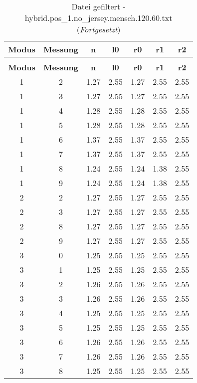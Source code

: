 \begin{longtable}{|c|c||c||c||c|c|c|}
	\caption{Datei gefiltert - hybrid.pos\_1.no\_jersey.mensch.120.60.txt} \label{tab:hybrid.pos-1.no-jersey.mensch.120.60.txt} \\ \hline
	\textbf{Modus} & \textbf{Messung} & \textbf{n} & \textbf{l0} & \textbf{r0} & \textbf{r1} & \textbf{r2}\\ \hline
	\endfirsthead
	\caption[]{Datei gefiltert - hybrid.pos\_1.no\_jersey.mensch.120.60.txt (\emph{Fortgesetzt})} \\ \hline
	\textbf{Modus} & \textbf{Messung} & \textbf{n} & \textbf{l0} & \textbf{r0} & \textbf{r1} & \textbf{r2}\\ \hline
	\endhead
	1 & 2 & 1.27 & 2.55 & 1.27 & 2.55 & 2.55 \\ \hline
	1 & 3 & 1.27 & 2.55 & 1.27 & 2.55 & 2.55 \\ \hline
	1 & 4 & 1.28 & 2.55 & 1.28 & 2.55 & 2.55 \\ \hline
	1 & 5 & 1.28 & 2.55 & 1.28 & 2.55 & 2.55 \\ \hline
	1 & 6 & 1.37 & 2.55 & 1.37 & 2.55 & 2.55 \\ \hline
	1 & 7 & 1.37 & 2.55 & 1.37 & 2.55 & 2.55 \\ \hline
	1 & 8 & 1.24 & 2.55 & 1.24 & 1.38 & 2.55 \\ \hline
	1 & 9 & 1.24 & 2.55 & 1.24 & 1.38 & 2.55 \\ \hline
	2 & 2 & 1.27 & 2.55 & 1.27 & 2.55 & 2.55 \\ \hline
	2 & 3 & 1.27 & 2.55 & 1.27 & 2.55 & 2.55 \\ \hline
	2 & 8 & 1.27 & 2.55 & 1.27 & 2.55 & 2.55 \\ \hline
	2 & 9 & 1.27 & 2.55 & 1.27 & 2.55 & 2.55 \\ \hline
	3 & 0 & 1.25 & 2.55 & 1.25 & 2.55 & 2.55 \\ \hline
	3 & 1 & 1.25 & 2.55 & 1.25 & 2.55 & 2.55 \\ \hline
	3 & 2 & 1.26 & 2.55 & 1.26 & 2.55 & 2.55 \\ \hline
	3 & 3 & 1.26 & 2.55 & 1.26 & 2.55 & 2.55 \\ \hline
	3 & 4 & 1.25 & 2.55 & 1.25 & 2.55 & 2.55 \\ \hline
	3 & 5 & 1.25 & 2.55 & 1.25 & 2.55 & 2.55 \\ \hline
	3 & 6 & 1.26 & 2.55 & 1.26 & 2.55 & 2.55 \\ \hline
	3 & 7 & 1.26 & 2.55 & 1.26 & 2.55 & 2.55 \\ \hline
	3 & 8 & 1.25 & 2.55 & 1.25 & 2.55 & 2.55 \\ \hline

\end{longtable}
